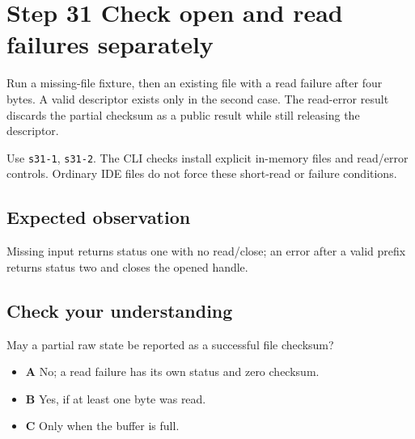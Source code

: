 \section{Step 31 Check open and read failures separately}\label{crc-s31}

Run a missing-file fixture, then an existing file with a read failure after four bytes. A valid descriptor exists only in the second case. The read-error result discards the partial checksum as a public result while still releasing the descriptor.

Use \texttt{s31-1}, \texttt{s31-2}. The CLI checks install explicit in-memory files and read/error controls. Ordinary IDE files do not force these short-read or failure conditions.

\subsection{Expected observation}
Missing input returns status one with no read/close; an error after a valid prefix returns status two and closes the opened handle.

\subsection{Check your understanding}
May a partial raw state be reported as a successful file checksum?

\begin{itemize}
  \item \textbf{A} No; a read failure has its own status and zero checksum.
  \item \textbf{B} Yes, if at least one byte was read.
  \item \textbf{C} Only when the buffer is full.
\end{itemize}
